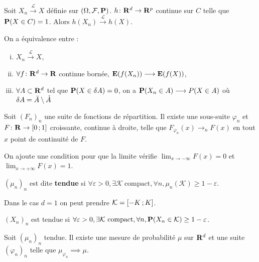 	\begin{thm}[de continuité]
		Soit $X_n \overset{\mathcal{L}}{\longrightarrow} X$ définie sur $(\Omega,\mathcal{F},\mathbf{P})$.
		$h \colon \mathbf{R}^d \to \mathbf{R}^p$ continue sur $C$ telle que $\mathbf{P}(X \in C) = 1$.
		Alors  $h(X_n) \overset{\mathcal{L}}{\longrightarrow} h(X)$.
	\end{thm}
	
	\begin{thm}[de Portmanteau]
		On a équivalence entre :
		\begin{enumerate}[(i)]
			\item $X_n \overset{\mathcal{L}}{\longrightarrow} X$,
			\item $\forall f \colon \mathbf{R}^d \to \mathbf{R}$ continue bornée, $\mathbf{E}(f(X_n)) \longrightarrow \mathbf{E}(f(X))$,
			\item $\forall A \subset \mathbf{R}^d$ tel que $\mathbf{P}(X \in \delta A) = 0$, on a $\mathbf{P}(X_n \in A) \longrightarrow P(X \in A)$ où $\delta A = \Bar{A} \setminus \mathring{A}$
		\end{enumerate}
	\end{thm}

	\begin{lem}[d'Helly]
		Soit $(F_n)_n$ une suite de fonctions de répartition.
		Il existe une sous-suite $\varphi_n$ et $F \colon \mathbf{R} \to \mathopen{}\mathclose{\left[0\mathclose{}\mathpunct{};1\right]}$ croissante, continue à droite, telle que $F_{\varphi_n}(x) \longrightarrow_n F(x)$ en tout $x$ point de continuité de $F$.
	\end{lem}
	
	On ajoute une condition pour que la limite vérifie $\lim_{x \to -\infty} F(x) = 0$ et $\lim_{x \to +\infty} F(x) = 1$.

	\begin{defn}
		$(\mu_n)_n$ est dite \textbf{tendue} si $\forall \varepsilon > 0, \exists \mathcal{K} \ \text{compact}, \forall n, \mu_n(\mathcal{K}) \geq 1 - \varepsilon$.
	\end{defn}

	Dans le cas $d = 1$ on peut prendre $\mathcal{K} = \mathopen{}\mathclose{\left[-K\mathclose{}\mathpunct{};K\right]}$.
	
	\begin{defn}
		$(X_n)_n$ est tendue si $\forall \varepsilon > 0, \exists \mathcal{K} \ \text{compact}, \forall n, \mathbf{P}(X_n \in \mathcal{K}) \geq 1 - \varepsilon$.
	\end{defn}

	\begin{thm}[de Prokhorov]
		Soit $(\mu_n)_n$ tendue.
		Il existe une mesure de probabilité $\mu$ sur $\mathbf{R}^d$ et une suite $(\varphi_n)_n$ telle que $\mu_{\varphi_n} \implies \mu$.
	\end{thm}

